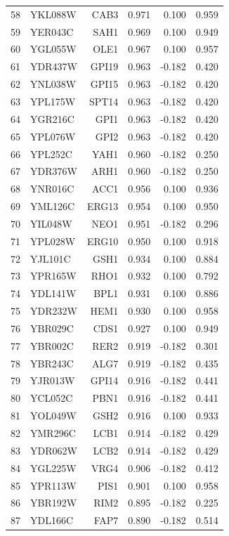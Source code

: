 \begin{longtable}{rlrrrr}
58 & YKL088W & CAB3 & 0.971 & 0.100 & 0.959\\
59 & YER043C & SAH1 & 0.969 & 0.100 & 0.949\\
60 & YGL055W & OLE1 & 0.967 & 0.100 & 0.957\\
61 & YDR437W & GPI19 & 0.963 & -0.182 & 0.420\\
62 & YNL038W & GPI15 & 0.963 & -0.182 & 0.420\\
63 & YPL175W & SPT14 & 0.963 & -0.182 & 0.420\\
64 & YGR216C & GPI1 & 0.963 & -0.182 & 0.420\\
65 & YPL076W & GPI2 & 0.963 & -0.182 & 0.420\\
66 & YPL252C & YAH1 & 0.960 & -0.182 & 0.250\\
67 & YDR376W & ARH1 & 0.960 & -0.182 & 0.250\\
68 & YNR016C & ACC1 & 0.956 & 0.100 & 0.936\\
69 & YML126C & ERG13 & 0.954 & 0.100 & 0.950\\
70 & YIL048W & NEO1 & 0.951 & -0.182 & 0.296\\
71 & YPL028W & ERG10 & 0.950 & 0.100 & 0.918\\
72 & YJL101C & GSH1 & 0.934 & 0.100 & 0.884\\
73 & YPR165W & RHO1 & 0.932 & 0.100 & 0.792\\
74 & YDL141W & BPL1 & 0.931 & 0.100 & 0.886\\
75 & YDR232W & HEM1 & 0.930 & 0.100 & 0.958\\
76 & YBR029C & CDS1 & 0.927 & 0.100 & 0.949\\
77 & YBR002C & RER2 & 0.919 & -0.182 & 0.301\\
78 & YBR243C & ALG7 & 0.919 & -0.182 & 0.435\\
79 & YJR013W & GPI14 & 0.916 & -0.182 & 0.441\\
80 & YCL052C & PBN1 & 0.916 & -0.182 & 0.441\\
81 & YOL049W & GSH2 & 0.916 & 0.100 & 0.933\\
82 & YMR296C & LCB1 & 0.914 & -0.182 & 0.429\\
83 & YDR062W & LCB2 & 0.914 & -0.182 & 0.429\\
84 & YGL225W & VRG4 & 0.906 & -0.182 & 0.412\\
85 & YPR113W & PIS1 & 0.901 & 0.100 & 0.958\\
86 & YBR192W & RIM2 & 0.895 & -0.182 & 0.225\\
87 & YDL166C & FAP7 & 0.890 & -0.182 & 0.514\\

\end{longtable}
